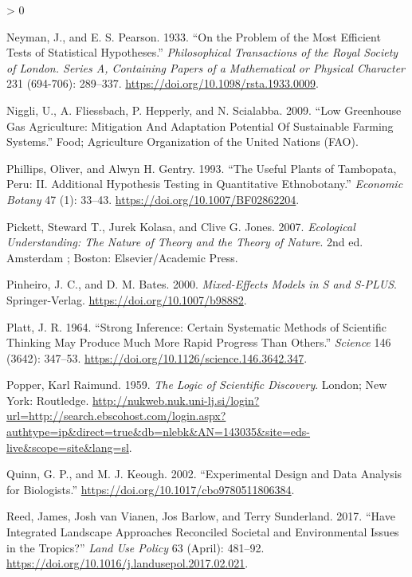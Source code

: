 \documentclass[
]{article}
\newlength{\cslhangindent}
\newenvironment{CSLReferences}[2] %
 {%
  \setlength{\parindent}{0pt}
  \ifodd #1 \everypar{\setlength{\hangindent}{\cslhangindent}}\ignorespaces\fi
  \ifnum #2 > 0
  \setlength{\parskip}{#2\baselineskip}
  \fi
 }%
 {}
\begin{document}
\begin{CSLReferences}{1}{0}
\leavevmode\hypertarget{ref-neyman__problem_1933}{}%
Neyman, J., and E. S. Pearson. 1933. {``On the Problem of the Most Efficient Tests of Statistical Hypotheses.''} \emph{Philosophical Transactions of the Royal Society of London. Series A, Containing Papers of a Mathematical or Physical Character} 231 (694-706): 289--337. \url{https://doi.org/10.1098/rsta.1933.0009}.

\leavevmode\hypertarget{ref-niggli_low_2009}{}%
Niggli, U., A. Fliessbach, P. Hepperly, and N. Scialabba. 2009. {``Low {Greenhouse} {Gas} {Agriculture}: {Mitigation} {And} {Adaptation} {Potential} {Of} {Sustainable} {Farming} {Systems}.''} Food; Agriculture Organization of the United Nations (FAO).

\leavevmode\hypertarget{ref-phillips_useful_1993}{}%
Phillips, Oliver, and Alwyn H. Gentry. 1993. {``The Useful Plants of {Tambopata}, {Peru}: {II}. {Additional} Hypothesis Testing in Quantitative Ethnobotany.''} \emph{Economic Botany} 47 (1): 33--43. \url{https://doi.org/10.1007/BF02862204}.

\leavevmode\hypertarget{ref-pickett_ecological_2007}{}%
Pickett, Steward T., Jurek Kolasa, and Clive G. Jones. 2007. \emph{Ecological Understanding: The Nature of Theory and the Theory of Nature}. 2nd ed. Amsterdam ; Boston: Elsevier/Academic Press.

\leavevmode\hypertarget{ref-pinheiro_mixed-effects_2000}{}%
Pinheiro, J. C., and D. M. Bates. 2000. \emph{Mixed-{Effects} {Models} in {S} and {S}-{PLUS}}. Springer-Verlag. \url{https://doi.org/10.1007/b98882}.

\leavevmode\hypertarget{ref-platt_strong_1964}{}%
Platt, J. R. 1964. {``Strong {Inference}: {Certain} Systematic Methods of Scientific Thinking May Produce Much More Rapid Progress Than Others.''} \emph{Science} 146 (3642): 347--53. \url{https://doi.org/10.1126/science.146.3642.347}.

\leavevmode\hypertarget{ref-popper_logic_1959}{}%
Popper, Karl Raimund. 1959. \emph{The Logic of Scientific Discovery}. London; New York: Routledge. \url{http://nukweb.nuk.uni-lj.si/login?url=http://search.ebscohost.com/login.aspx?authtype=ip\&direct=true\&db=nlebk\&AN=143035\&site=eds-live\&scope=site\&lang=sl}.

\leavevmode\hypertarget{ref-quinn_experimental_2002}{}%
Quinn, G. P., and M. J. Keough. 2002. {``Experimental {Design} and {Data} {Analysis} for {Biologists}.''} \url{https://doi.org/10.1017/cbo9780511806384}.

\leavevmode\hypertarget{ref-reed_have_2017}{}%
Reed, James, Josh van Vianen, Jos Barlow, and Terry Sunderland. 2017. {``Have Integrated Landscape Approaches Reconciled Societal and Environmental Issues in the Tropics?''} \emph{Land Use Policy} 63 (April): 481--92. \url{https://doi.org/10.1016/j.landusepol.2017.02.021}.


\end{CSLReferences}
\end{document}
